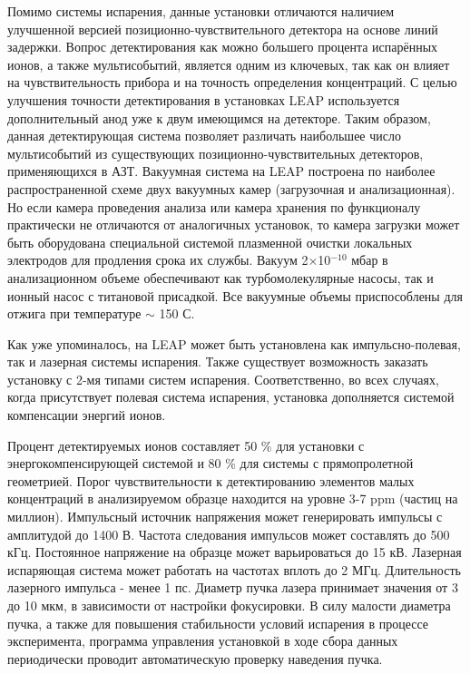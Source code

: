 Помимо системы испарения, данные установки отличаются наличием улучшенной версией позиционно-чувствительного детектора на основе линий задержки. Вопрос детектирования как можно большего процента испарённых ионов, а также мультисобытий, является одним из ключевых, так как он влияет на чувствительность прибора и на точность определения концентраций. С целью улучшения точности детектирования в установках LEAP используется дополнительный анод уже к двум имеющимся на детекторе. Таким образом, данная детектирующая система позволяет различать наибольшее число мультисобытий из существующих позиционно-чувствительных детекторов, применяющихся в АЗТ.
Вакуумная система на LEAP построена по наиболее распространенной схеме двух вакуумных камер (загрузочная и анализационная). Но если камера проведения анализа или камера хранения по функционалу практически не отличаются от аналогичных установок, то камера загрузки может быть оборудована специальной системой плазменной очистки локальных электродов для продления срока их службы. Вакуум 2×10$^{-10}$ мбар в анализационном объеме обеспечивают как турбомолекулярные насосы, так и ионный насос с титановой присадкой. Все вакуумные объемы приспособлены для отжига при температуре $\sim$ 150 \textdegree С.

Как уже упоминалось, на LEAP может быть установлена как импульсно-полевая, так и лазерная системы испарения. Также существует возможность заказать установку с 2-мя типами систем испарения. Соответственно, во всех случаях, когда присутствует полевая система испарения, установка дополняется системой компенсации энергий ионов.

Процент детектируемых ионов составляет 50 \% для установки с энергокомпенсирующей системой и 80 \% для системы с прямопролетной геометрией. Порог чувствительности к детектированию элементов малых концентраций в анализируемом образце находится на уровне 3-7 ppm (частиц на миллион). Импульсный источник напряжения может генерировать импульсы с амплитудой до 1400 В. Частота следования импульсов может составлять до 500 кГц. Постоянное напряжение на образце может варьироваться до 15 кВ. Лазерная испаряющая система может работать на частотах вплоть до 2 МГц. Длительность лазерного импульса - менее 1 пс. Диаметр пучка лазера принимает значения от 3 до 10 мкм, в зависимости от настройки фокусировки. В силу малости диаметра пучка, а также для повышения стабильности условий испарения в процессе эксперимента, программа управления установкой в ходе сбора данных периодически проводит автоматическую проверку наведения пучка.

